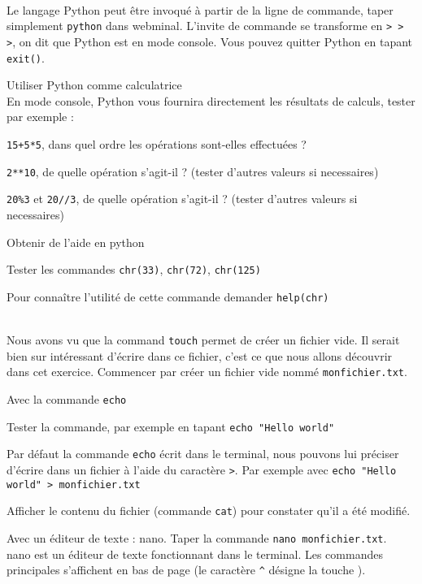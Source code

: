 \documentclass[11pt,a4paper]{article}
\begin{document}
\\
Le langage Python peut être invoqué à partir de la ligne de commande, taper simplement 	\texttt{python} dans webminal.
L'invite de commande se transforme en \texttt{>\,>\,>}, on dit que Python est en mode console. Vous pouvez quitter Python en tapant \texttt{exit()}.
\QListe
\item Utiliser Python comme calculatrice \\
En mode console, Python vous fournira directement les résultats de calculs, tester par exemple :
\SQListe
\item \texttt{15+5*5}, dans quel ordre les opérations sont-elles effectuées ?
\item \texttt{2**10}, de quelle opération s'agit-il ? (tester d'autres valeurs si necessaires)
\item \texttt{20\%3}  et  \texttt{20//3}, de quelle opération s'agit-il ? (tester d'autres valeurs si necessaires)
\FinListe
\item Obtenir de l'aide en python
\SQListe
\item Tester les commandes \texttt{chr(33)},  \texttt{chr(72)}, \texttt{chr(125)}
\item Pour connaître l'utilité de cette commande demander \texttt{help(chr)}
\FinListe
\FinListe
\vspace{0.1cm}


\\
Nous avons vu que la command \texttt{touch} permet de créer un fichier vide. Il serait bien sur intéressant d'écrire dans ce fichier, c'est ce que nous allons découvrir dans cet exercice.
Commencer par créer un fichier vide nommé \texttt{monfichier.txt}.
\QListe
\item Avec la commande \texttt{echo}
\SQListe
\item Tester la commande, par exemple en tapant \texttt{echo "Hello world"}
\item Par défaut la commande \texttt{echo} écrit dans le terminal, nous pouvons lui préciser d'écrire dans un fichier à l'aide du caractère \texttt{>}. Par exemple avec \texttt{echo "Hello world" > monfichier.txt}
\item Afficher le contenu du fichier (commande \texttt{cat}) pour constater qu'il a été modifié.
\FinListe
\item Avec un éditeur de texte : nano. Taper la commande \texttt{nano monfichier.txt}.\\
nano est un éditeur de texte fonctionnant dans le terminal. Les commandes principales s'affichent en bas de page (le caractère \texttt{\^} désigne la touche ).
\FinListe
\vspace{0.1cm}
\end{document}
